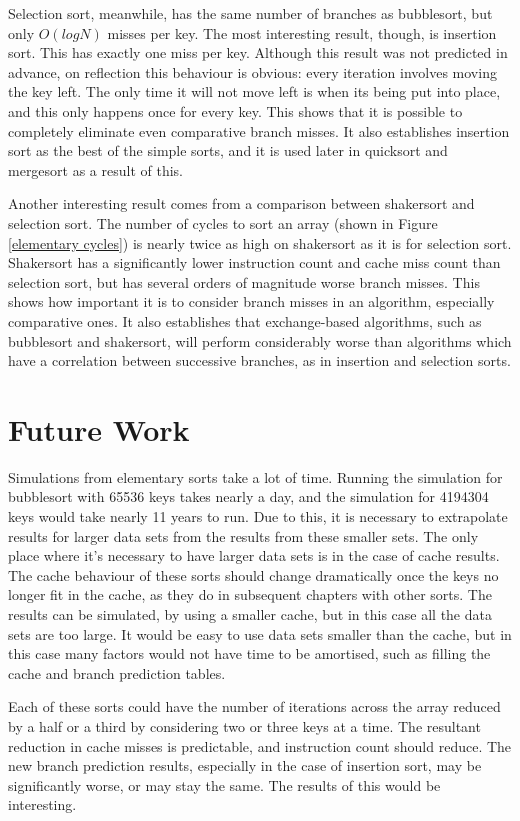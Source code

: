 Selection sort, meanwhile, has the same number of branches as bubblesort, but
only $O(logN)$ misses per key. The most interesting result, though, is insertion
sort. This has exactly one miss per key. Although this result was not predicted
in advance, on reflection this behaviour is obvious: every iteration involves
moving the key left. The only time it will not move left is when its being put
into place, and this only happens once for every key. This shows that it is
possible to completely eliminate even comparative branch misses. It also
establishes insertion sort as the best of the simple sorts, and it is used later
in quicksort and mergesort as a result of this. \label{insertion is
predictable}

Another interesting result comes from a comparison between shakersort and
selection sort. The number of cycles to sort an array (shown in Figure
\ref{elementary cycles}) is nearly twice as high on shakersort as it is for
selection sort. Shakersort has a significantly lower instruction count and cache
miss count than selection sort, but has several orders of magnitude worse branch
misses. This shows how important it is to consider branch misses in an
algorithm, especially comparative ones. It also establishes that exchange-based
algorithms, such as bubblesort and shakersort, will perform considerably worse
than algorithms which have a correlation between successive branches, as in
insertion and selection sorts.

\section{Future Work}
Simulations from elementary sorts take a lot of time. Running the simulation for
bubblesort with 65536 keys takes nearly a day, and the simulation for 4194304
keys would take nearly 11 years to run. Due to this, it is necessary to
extrapolate results for larger data sets from the results from these smaller
sets. The only place where it's necessary to have larger data sets is in the
case of cache results. The cache behaviour of these sorts should change
dramatically once the keys no longer fit in the cache, as they do in subsequent
chapters with other sorts. The results can be simulated, by using a
smaller cache, but in this case all the data sets are too large. It would be
easy to use data sets smaller than the cache, but in this case many factors
would not have time to be amortised, such as filling the cache and branch
prediction tables.

Each of these sorts could have the number of iterations across the array reduced
by a half or a third by considering two or three keys at a time. The resultant
reduction in cache misses is predictable, and instruction count should reduce.
The new branch prediction results, especially in the case of insertion sort, may
be significantly worse, or may stay the same. The results of this would be
interesting.

